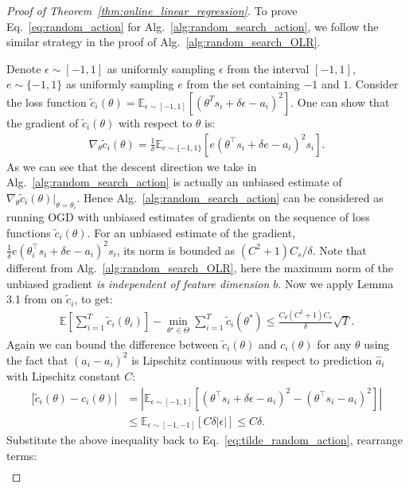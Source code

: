 \begin{proof}[Proof of Theorem~\ref{thm:online_linear_regression}]
To prove Eq.~\ref{eq:random_action} for Alg.~\ref{alg:random_search_action}, we follow the similar strategy in the proof of Alg.~\ref{alg:random_search_OLR}.

Denote $\epsilon \sim [-1,1]$ as uniformly sampling $\epsilon$ from the interval $[-1,1]$, $e\sim \{-1,1\}$ as uniformly sampling $e$ from the set containing $-1$ and $1$. Consider the loss function $\tilde{c}_i(\theta) = \mathbb{E}_{\epsilon\sim [-1,1]}[(\theta^T s_i + \delta \epsilon - a_i)^2]$. One can show that the gradient of $\tilde{c}_i(\theta)$ with respect to $\theta$ is:
\begin{align}
    \nabla_{\theta}\tilde{c}_i(\theta) = \frac{1}{\delta}\mathbb{E}_{e\sim \{-1,1\}}[e(\theta^{\top} s_i + \delta e - a_i)^2 s_i].
\end{align} As we can see that the descent direction we take in Alg.~\ref{alg:random_search_action} is actually an unbiased estimate of $\nabla_{\theta}\tilde{c}_i(\theta)|_{\theta=\theta_i}$. Hence Alg.~\ref{alg:random_search_action} can be considered as running OGD with unbiased estimates of gradients on the sequence of loss functions $\tilde{c}_i(\theta)$. For an unbiased estimate of the gradient, $\frac{1}{\delta} e(\theta_i^{\top} s_i +\delta e - a_i)^2 s_i$, its norm is bounded as $(C^2 + 1)C_{s}/\delta$. Note that different from Alg.~\ref{alg:random_search_OLR}, here the maximum norm of the unbiased gradient \emph{is independent of feature dimension $b$}. Now we apply Lemma 3.1 from \cite{flaxman2005online} on $\tilde{c}_i$, to get:
\begin{align}
\label{eq:tilde_random_action}
    \mathbb{E}\left[ \sum_{i=1}^T \tilde{c}_i(\theta_i)\right] - \min_{\theta^\star\in{\Theta}}\sum_{i=1}^T \tilde{c}_i(\theta^*) \leq \frac{C_{\theta}(C^2 + 1)C_{s}}{\delta}\sqrt{T}.
\end{align}
Again we can bound the difference between $\tilde{c}_i(\theta)$ and $c_i(\theta)$ for any $\theta$ using the fact that $(\hat{a}_i - a_i)^2$ is Lipschitz continuous with respect to prediction $\hat{a}_i$ with Lipschitz constant $C$:
\begin{align}
    |\tilde{c}_i(\theta) - c_i(\theta)| &= |\mathbb{E}_{\epsilon\sim [-1,1]} [(\theta^{\top} s_i + \delta\epsilon - a_i)^2 - (\theta^{\top} s_i - a_i)^2]|  \nonumber\\
    &\leq \mathbb{E}_{\epsilon\sim [-1,-1]}[C\delta |\epsilon|] \leq C\delta.
\end{align} Substitute the above inequality back to Eq.~\ref{eq:tilde_random_action}, rearrange terms:
\begin{align*}

\end{align*}
\end{proof}
